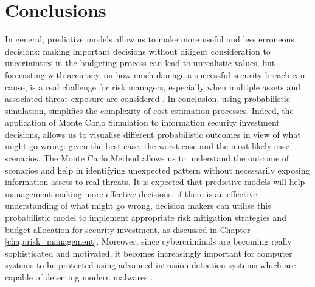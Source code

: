\section{Conclusions}
\label{chap:conclusions}
In general, predictive models allow us to make more useful and less erroneous decisions: making important decisions without diligent consideration to uncertainties in the budgeting process can lead to unrealistic values, but forecasting with accuracy, on how much damage a successful security breach can cause, is a real challenge for risk managers, especially when multiple assets and associated threat exposure are considered \parencite{Fagade}.
In conclusion, using probabilistic simulation, simplifies the complexity of cost estimation processes.
Indeed, the application of Monte Carlo Simulation to information security investment decisions, allows us to visualise different probabilistic outcomes in view of what might go wrong: given the best case, the worst case and the most likely case scenarios.
The Monte Carlo Method allows us to understand the outcome of scenarios and help in identifying unexpected pattern without necessarily exposing information assets to real threats.
It is expected that predictive models will help management making more effective decisions: if there is an effective understanding of what might go wrong, decision makers can utilise this probabilistic model to implement appropriate risk mitigation strategies and budget allocation for security investment, as discussed in \hyperref[chap:risk_management]{Chapter \ref*{chap:risk_management}}.
Moreover, since cybercriminals are becoming really sophisticated and motivated, it becomes increasingly important for computer systems to be protected using advanced intrusion detection systems which are capable of detecting modern malwares \parencite{Khraisat}.